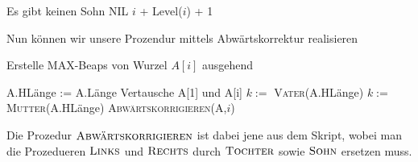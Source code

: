 \begin{solution}
\begin{enumerate}[label = \alph*)]
\phantom{}

    \begin{algorithmic}[1]
            \Comment Es gibt keinen Sohn
                \State \Return NIL
            \Else
                \State \Return $i$ + Level($i$) + 1
            \EndIf
        \EndProcedure
    \end{algorithmic}


Nun können wir unsere Prozendur mittels Abwärtskorrektur realisieren

\begin{algorithm}
  \caption{Erstelle MAX-Beaps von Wurzel $A[i]$ ausgehend}
  \begin{algorithmic}[1]
          \State A.HLänge := A.Länge
          \State Vertausche A[1] und A[i]
          \State $k :=$ \textsc{Vater}(A.HLänge)
            \State $k :=$ \textsc{Mutter}(A.HLänge)
          \EndIf
              \State \textsc{Abwärtskorrigieren(A,$i$)}
            \EndFor
          \EndIf
      \EndProcedure
  \end{algorithmic}
\end{algorithm}

Die Prozedur $\textsc{Abwärtskorrigieren}$ ist dabei jene aus dem Skript, wobei man die Prozedueren $\textsc{Links}$ und $\textsc{Rechts}$ durch $\textsc{Tochter}$ sowie $\textsc{Sohn}$ ersetzen muss.

\end{enumerate}

\end{solution}
